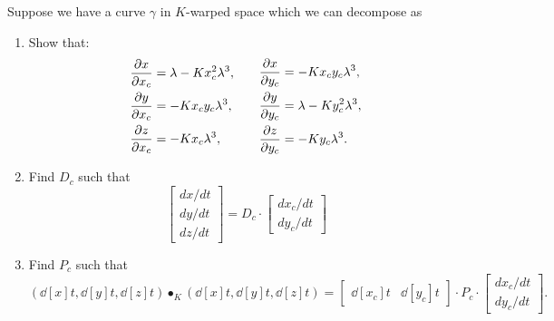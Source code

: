 \documentclass[newpage,hints,handout,12pt,noauthor,nooutcomes]{ximera}
\begin{document}
\begin{problem}
  Suppose we have a curve $\gamma$ in $K$-warped space which we can
  decompose as
  \begin{center}
    \end{center}
\begin{enumerate}
\item Show that:
  \[
  \begin{split}
    \pp[x]{x_c} &=\lambda -Kx_c^2 \lambda^3,\\
    \pp[y]{x_c} &=-Kx_cy_c \lambda^3,\\
    \pp[z]{x_c} &=-Kx_c \lambda^3,
  \end{split}
  \qquad
  \begin{split}
    \pp[x]{y_c} &= -Kx_cy_c \lambda^3,\\
    \pp[y]{y_c} &= \lambda - Ky_c^2 \lambda^3,\\
    \pp[z]{y_c} &= -Ky_c \lambda^3.
  \end{split}
  \]
  \item Find $D_c$ such
      that
      \[
      \begin{bmatrix}
        dx/dt\\ dy/dt \\ dz/dt
      \end{bmatrix}
      = D_c \cdot
      \begin{bmatrix}
        dx_c/dt \\ dy_c/dt
      \end{bmatrix}
      \]
    \item Find $P_c$ such that
      \[
      \left(\dd[x]{t}, \dd[y]{t}, \dd[z]{t}\right)\bullet_K
      \left(\dd[x]{t}, \dd[y]{t}, \dd[z]{t}\right)
      =
      \begin{bmatrix}
        \dd[x_c]{t} &  \dd[y_c]{t}
      \end{bmatrix}
      \cdot P_c
      \cdot
      \begin{bmatrix}
        dx_c/dt \\  dy_c/dt
      \end{bmatrix}.
      \]
\end{enumerate}


\end{problem}
\end{document}

